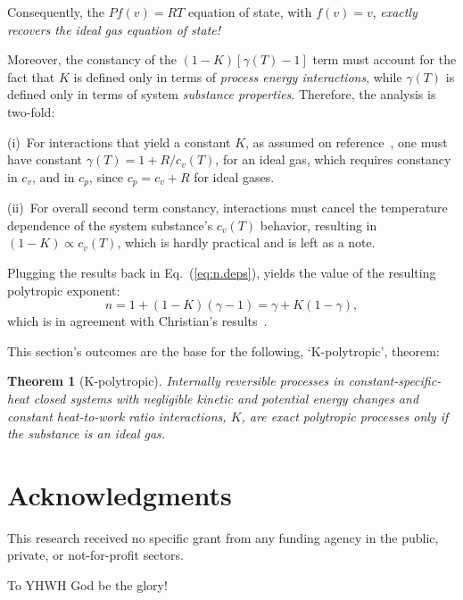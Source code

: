 \documentclass[fleqn,11pt]{SelfArx}
\newtheorem{theorem}{Theorem}
\begin{document}
    Consequently, the $Pf(v) = RT$ equation of state, with $f(v) =  v$,  \emph{exactly  recovers
    the ideal gas equation of state!}

    Moreover, the constancy of the $(1 - K)[\gamma(T) - 1]$ term must account for the fact  that
    $K$ is defined only in terms of \emph{process energy  interactions},  while  $\gamma(T)$  is
    defined only in terms of system \emph{substance  properties}.  Therefore,  the  analysis  is
    two-fold:

    (i)~For    interactions    that    yield    a    constant     $K$,     as     assumed     on
    reference~\cite{2012-ChristiansJ-IntJMechEngEduc}, one must have constant $\gamma(T) =  1  +
    R/c_v(T)$, for an ideal gas, which requires constancy in $c_v$, and in $c_p$, since  $c_p  =
    c_v + R$ for ideal gases.

    (ii)~For overall second term constancy, interactions must cancel the temperature  dependence
    of the system substance's $c_v(T)$ behavior, resulting in $(1 - K) \propto c_v(T)$, which is
    hardly practical and is left as a note.

    Plugging the results back in  Eq.~(\ref{eq:n.deps}),  yields  the  value  of  the  resulting
    polytropic exponent:
    \begin{equation}
        n = 1 + (1 - K)(\gamma - 1) = \gamma + K(1 - \gamma),
        \label{eq:n.final}
    \end{equation}
    \noindent        which        is        in        agreement         with         Christian's
    results~\cite{2012-ChristiansJ-IntJMechEngEduc}.

    This section's outcomes are the base for the following, `K-polytropic', theorem:

    \begin{theorem}[K-polytropic]\label{theo:K.poly}
        Internally reversible processes in constant-specific-heat closed systems with negligible
        kinetic and potential energy changes and constant heat-to-work ratio interactions,  $K$,
        are exact polytropic processes only if the substance is an ideal gas.
    \end{theorem}

\section*{Acknowledgments}

    This research received no specific grant from any funding agency in the public, private,  or
    not-for-profit sectors.

    To YHWH God be the glory!





\end{document}
